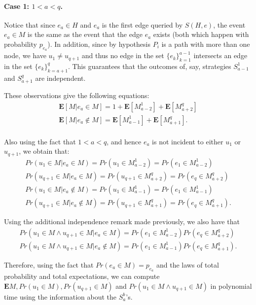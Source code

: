 \documentclass[12pt]{article}
\newcommand{\E}[1]{\mathbf{E}\left[#1\right]}
\newcommand{\Ep}[1]{\mathbf{E}#1}
\begin{document}
	\paragraph{Case 1: $1 < a < q$.} Notice that since $e_a \in H$ and $e_a$ is the first edge queried by $S(H, e)$, the event $e_a \in M$ is the same as the event that the edge $e_a$ exists (both which happen with probability $p_{e_a}$). In addition, since by hypothesis $P_i$ is a path with more than one node, we have $u_1 \neq u_{q + 1}$ and thus no edge in the set $\{e_k\}_{k = 1}^{a-1}$ intersects an edge in the set $\{e_k\}_{k = a+1}^{q}$. This guarantees that the outcomes of, say, strategies $S_{a-1}^1$ and $S_{a + 1}^q$ are independent. 
	
	These observations give the following equations:
	\begin{gather*}
		\E{M \Big | e_a \in M} = 1 + \E{M_{a - 2}^1} + \E{M_{a + 2}^q}\\
		\E{M \Big | e_a \notin M} = \E{M_{a - 1}^1} + \E{M_{a + 1}^q}.\\
	\end{gather*}
	
	Also using the fact that $1 < a < q$, and hence $e_a$ is not incident to either $u_1$ or $u_{q+1}$, we obtain that: 
	\begin{gather*}
		Pr(u_1 \in M | e_a \in M) = Pr(u_1 \in M_{a-2}^1) = Pr(e_1 \in M_{a - 2}^1) \\
		Pr(u_{q+1} \in M | e_a \in M) = Pr(u_{q+1} \in M_{a+2}^q) = Pr(e_q \in M_{a+2}^q)\\
		Pr(u_1 \in M | e_a \notin M) = Pr(u_1 \in M_{a-1}^1) = Pr(e_1 \in M_{a - 1}^1)\\
		Pr(u_{q+1} \in M | e_a \notin M) = Pr(u_{q+1} \in M_{a + 1}^q) = Pr(e_q \in M_{a + 1}^q).
	\end{gather*}
	
	Using the additional independence remark made previously, we also have that 
\begin{gather*}
		Pr(u_1 \in M \wedge u_{q + 1} \in M | e_a \in M) = Pr(e_1 \in M_{a-2}^1) Pr(e_q \in M_{a+2}^q) \\
		Pr(u_1 \in M \wedge u_{q + 1} \in M | e_a \notin M) = Pr(e_1 \in M_{a-1}^1) Pr(e_q \in M_{a+1}^q).
	\end{gather*}		
	
	Therefore, using the fact that $Pr(e_a \in M) = p_{e_a}$ and the laws of total probability and total expectations, we can compute $\Ep{M}, Pr(u_1 \in M), Pr(u_{q+1} \in M)$ and $Pr(u_1 \in M \wedge u_{q + 1} \in M)$ in polynomial time using the information about the $S_a^b$'s. 
	
\end{document}
